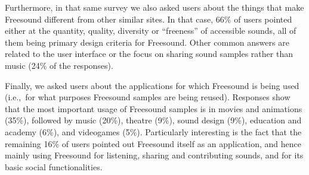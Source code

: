 Furthermore, in that same survey we also asked users about the things that make Freesound different from other similar sites. In that case, 66\% of users pointed either at the quantity, quality, diversity or ``freeness'' of accessible sounds, all of them being primary design criteria for Freesound. Other common answers are related to the user interface or the focus on sharing sound samples rather than music (24\% of the responses). 

Finally, we asked users about the applications for which Freesound is being used (i.e.,~for what purposes Freesound samples are being reused). 
Responses show that the most important usage of Freesound samples is in movies and animations (35\%), followed by music (20\%), theatre (9\%), sound design (9\%), education and academy (6\%), and videogames (5\%). Particularly interesting is the fact that the remaining 16\% of users pointed out Freesound itself as an application, and hence mainly using Freesound for listening, sharing and contributing sounds, and for its basic social functionalities.
 